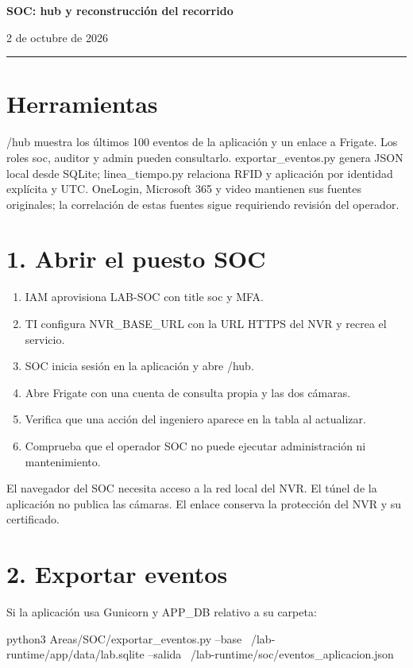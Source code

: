 \documentclass[12pt,a4paper]{article}
\begin{document}
{\LARGE\bfseries SOC: hub y reconstrucción del recorrido\par}\vspace{6pt}
2 de octubre de 2026\par\hrule\vspace{10pt}
\section*{Herramientas}
\textnormal{/\allowbreak{}hub} muestra los últimos 100 eventos de la aplicación y un enlace a Frigate. Los roles soc, auditor y admin pueden consultarlo. \textnormal{exportar\_\allowbreak{}eventos.py} genera JSON local desde SQLite; \textnormal{linea\_\allowbreak{}tiempo.py} relaciona RFID y aplicación por identidad explícita y UTC. OneLogin, Microsoft 365 y video mantienen sus fuentes originales; la correlación de estas fuentes sigue requiriendo revisión del operador.\par
{}\section*{1. Abrir el puesto SOC}
\begin{enumerate}
\item IAM aprovisiona LAB-SOC con title soc y MFA.
\item TI configura NVR\_BASE\_URL con la URL HTTPS del NVR y recrea el servicio.
\item SOC inicia sesión en la aplicación y abre \textnormal{/\allowbreak{}hub}.
\item Abre Frigate con una cuenta de consulta propia y las dos cámaras.
\item Verifica que una acción del ingeniero aparece en la tabla al actualizar.
\item Comprueba que el operador SOC no puede ejecutar administración ni mantenimiento.
\end{enumerate}
El navegador del SOC necesita acceso a la red local del NVR. El túnel de la aplicación no publica las cámaras. El enlace conserva la protección del NVR y su certificado.\par
{}\section*{2. Exportar eventos}
Si la aplicación usa Gunicorn y APP\_DB relativo a su carpeta:\par
{}
\begin{Comandos}
python3 Areas/SOC/exportar_eventos.py --base ~/lab-runtime/app/data/lab.sqlite --salida ~/lab-runtime/soc/eventos_aplicacion.json
\end{Comandos}
\end{document}
